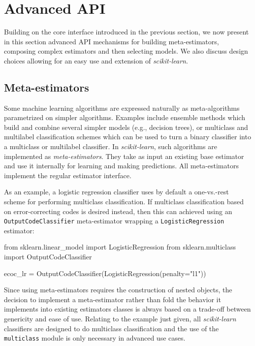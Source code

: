 \documentclass{llncs}
\newcommand{\sklearn}{\textit{scikit-learn}\xspace}
\begin{document}
\section{Advanced API}

\label{sec:advanced-api}

Building on the core interface introduced in the previous section, we now
present in this section advanced API mechanisms for building meta-estimators,
composing complex estimators and then selecting models. We also discuss design
choices allowing for an easy use and extension of \sklearn.

\subsection{Meta-estimators}

Some machine learning algorithms are expressed naturally
as meta-algorithms parametrized on simpler algorithms.
Examples include ensemble methods which
build and combine several simpler models (e.g., decision trees), or multiclass
and multilabel classification schemes which can be used to turn a binary
classifier into a multiclass or multilabel classifier. In \sklearn, such algorithms are
implemented as \textit{meta-estimators}. They take as input an existing base
estimator and use it internally for learning and making predictions.
All meta-estimators implement the regular estimator interface.

As an example, a logistic regression classifier
uses by default a one-vs.-rest scheme
for performing multiclass classification.
If multiclass classification based on error-correcting codes
\citep{dietterich1995solving} is desired instead,
then this can achieved  using an \texttt{OutputCodeClassifier} meta-estimator
wrapping a \texttt{LogisticRegression} estimator:
\begin{pythoncode}
from sklearn.linear_model import LogisticRegression
from sklearn.multiclass import OutputCodeClassifier

ecoc_lr = OutputCodeClassifier(LogisticRegression(penalty="l1"))
\end{pythoncode}

Since using meta-estimators requires the construction of nested objects,
the decision to implement a meta-estimator
rather than fold the behavior it implements
into existing estimators classes
is always based on a trade-off between genericity and ease of use.
Relating to the example just given,
all \sklearn classifiers are designed to do multiclass classification
and the use of the \texttt{multiclass} module
is only necessary in advanced use cases.
\end{document}
